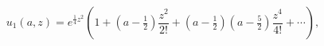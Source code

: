 \[u_{1}(a,z)=e^{\tfrac{1}{4}z^{2}}\left(1+(a-\tfrac{1}{2})\frac{z^{2}}{2!}+(a-%
\tfrac{1}{2})(a-\tfrac{5}{2})\frac{z^{4}}{4!}+\cdots\right),\]